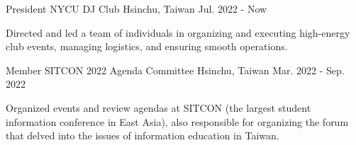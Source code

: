

\begin{cventries}

  \cventry
    {President} %
    {NYCU DJ Club} %
    {Hsinchu, Taiwan} %
    {Jul. 2022 - Now} %
    {
      \begin{cvitems} %
        \item {Directed and led a team of individuals in organizing and executing high-energy club events, managing logistics, and ensuring smooth operations.}
      \end{cvitems}
    }

\cventry
{Member} %
{SITCON 2022 Agenda Committee} %
{Hsinchu, Taiwan} %
{Mar. 2022 - Sep. 2022} %
{
  \begin{cvitems} %
    \item {Organized events and review agendas at SITCON (the largest student information conference in East Asia), also responsible for organizing the forum that delved into the issues of information education in Taiwan.}
  \end{cvitems}
}

\end{cventries}
